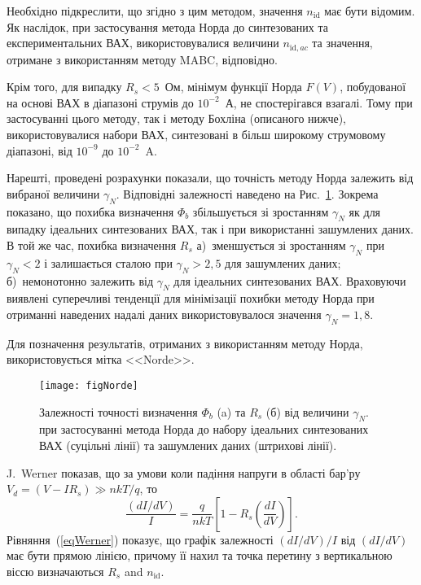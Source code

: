 Необхідно підкреслити, що згідно з цим методом, значення $n_\mathrm{id}$ має бути відомим.
Як наслідок, при застосування метода Норда до синтезованих та експериментальних ВАХ, використовувалися величини $n_{\mathrm{id},ac}$ та значення, отримане з використанням методу MABC, відповідно.

Крім того, для випадку  $R_s<5$~Ом, мінімум функції Норда $F(V)$, побудованої на основі ВАХ в діапазоні струмів до $10^{-2}$~А, не спостерігався взагалі.
Тому при застосуванні цього методу, так і методу Бохліна (описаного нижче), використовувалися набори ВАХ, синтезовані в більш широкому струмовому діапазоні, від $10^{-9}$ до $10^{-2}$~A.

Нарешті, проведені розрахунки показали, що точність методу Норда залежить від вибраної величини $\gamma_N$.
Відповідні залежності наведено на Рис.~\ref{figNorde}.
Зокрема показано, що похибка визначення $\Phi_b$ збільшується зі зростанням $\gamma_N$ як для випадку ідеальних синтезованих ВАХ, так і при використанні зашумлених даних.
В той же час, похибка визначення  $R_s$
а)~зменшується зі зростанням $\gamma_N$ при $\gamma_N<2$ і залишається сталою при $\gamma_N>2,5$ для зашумлених даних;
б)~немонотонно залежить від $\gamma_N$ для ідеальних синтезованих ВАХ.
Враховуючи виявлені суперечливі тенденції для мінімізації похибки методу Норда при отриманні наведених надалі даних використовувалося значення $\gamma_N=1,8$.

Для позначення результатів, отриманих з використанням методу Норда, використовується мітка <<Norde>>.

\begin{figure}
\center
\texttt{[image: figNorde]}%
\caption{\label{figNorde}
Залежності точності визначення $\Phi_b$ (a) та $R_s$ (б)  від величини $\gamma_N$.
 при застосуванні метода Норда до набору ідеальних синтезованих ВАХ (суцільні лінії) та зашумлених даних (штрихові лінії).
}
\end{figure}

J.~Werner  \cite{Werner} показав, що за умови коли падіння напруги в області бар'ру $V_d=(V-IR_s)\gg nkT/q$, то
\begin{equation}
\label{eqWerner}
\frac{(dI/dV)}{I}=\frac{q}{nkT}\left[1-R_s\left(\frac{dI}{dV}\right)\right].
\end{equation}
Рівняння~(\ref{eqWerner}) показує, що графік  залежності   $(dI/dV)/I$  від $(dI/dV)$ має бути прямою лінією,
причому її нахил та точка перетину з вертикальною віссю визначаються $R_s$ and $n_\mathrm{id}$.

